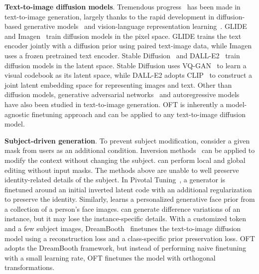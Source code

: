 \textbf{Text-to-image diffusion models}. Tremendous progress~\cite{saharia2022photorealistic,ramesh2022hierarchical,rombach2022high,gu2022vector,nichol2022glide} has been made in text-to-image generation, largely thanks to the rapid development in diffusion-based generative models~\cite{ho2020denoising,song2021score,song2021denoising,dhariwal2021diffusion} and vision-language representation learning~\cite{su2020vlbert,lu2019vilbert,radford2021learning,wang2021simvlm,li2022blip,li2023blip,alayrac2022flamingo,schuhmann2022laion}. GLIDE~\cite{nichol2022glide} and Imagen~\cite{saharia2022photorealistic} train diffusion models in the pixel space. GLIDE trains the text encoder jointly with a diffusion prior using paired text-image data, while Imagen uses a frozen pretrained text encoder. Stable Diffusion~\cite{rombach2022high} and DALL-E2~\cite{ramesh2022hierarchical} train diffusion models in the latent space. Stable Diffusion uses VQ-GAN~\cite{esser2021taming} to learn a visual codebook as its latent space, while DALL-E2 adopts CLIP~\cite{radford2021learning} to construct a joint latent embedding space for representing images and text. Other than diffusion models, generative adversarial networks~\cite{reed2016generative,zhang2017stackgan,xu2018attngan,li2019controllable} and autoregressive models~\cite{ramesh2021zero,ding2021cogview,wu2022nuwa,yuscaling} have also been studied in text-to-image generation. OFT is inherently a model-agnostic finetuning approach and can be applied to any text-to-image diffusion model.



\textbf{Subject-driven generation}. To prevent subject modification, \cite{avrahami2022blended,nichol2022glide} consider a given mask from users as an additional condition. Inversion methods~\cite{choi2021ilvr,dhariwal2021diffusion,ramesh2022hierarchical,gal2022image} can be applied to modify the context without changing the subject. \cite{hertz2022prompt} can perform local and global editing without input masks. The methods above are unable to well preserve identity-related details of the subject. In Pivotal Tuning~\cite{roich2022pivotal}, a generator is finetuned around an initial inverted latent code with an additional regularization to preserve the identity. Similarly, \cite{nitzan2022mystyle} learns a personalized generative face prior from a collection of a person's face images. \cite{casanova2021instance} can generate difference variations of an instance, but it may lose the instance-specific details. With a customized token and a few subject images, DreamBooth~\cite{ruiz2023dreambooth} finetunes the text-to-image diffusion model using a reconstruction loss and a class-specific prior preservation loss. OFT adopts the DreamBooth framework, but instead of performing naive finetuning with a small learning rate, OFT finetunes the model with orthogonal transformations.



